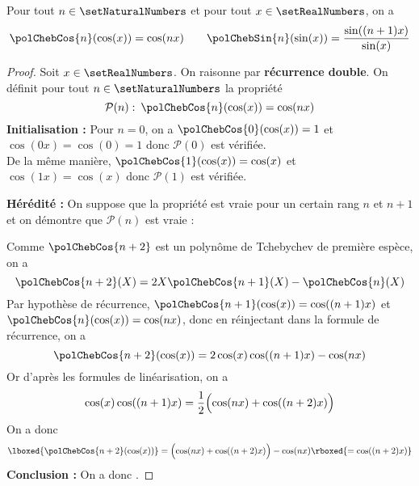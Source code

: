 \begin{property}
Pour tout $n \in \setNaturalNumbers$ et pour tout $x \in \setRealNumbers$, on a
\[
\polChebCos{n}(\cos(x))=\cos(nx) 
\quad\quad
\polChebSin{n}(\sin(x))=\dfrac{\sin((n+1)x)}{\sin(x)}
\]
\end{property}

\begin{proof}
Soit $x \in \setRealNumbers$. On raisonne par \textbf{récurrence double}. On définit pour tout $n \in \setNaturalNumbers$ la propriété
\[
\mathcal{P}(n) : \:\polChebCos{n}(\cos(x))=\cos(nx) 
\]
\textbf{Initialisation :} Pour $n=0$, on a $\polChebCos{0}(\cos(x)) = 1$ et $\cos(0x) =\cos(0) = 1$ donc $\mathcal{P}(0)$ est vérifiée.\\
De la même manière, $\polChebCos{1}(\cos(x)) = \cos(x)$ et $\cos(1x)=\cos(x)$ donc $\mathcal{P}(1)$ est vérifiée. 

\textbf{Hérédité :} On suppose que la propriété est vraie pour un certain rang $n$ et $n+1$ et on démontre que $\mathcal{P}(n)$ est vraie :

Comme $\polChebCos{n+2}$ est un polynôme de Tchebychev de première espèce, on a 
\[
\polChebCos{n+2}(X) = 2 X \polChebCos{n+1}(X) - \polChebCos{n}(X)
\]
Par hypothèse de récurrence, $\polChebCos{n+1}(\cos(x)) = \cos((n+1)x)$ et $\polChebCos{n}(\cos(x)) = \cos(nx)$, donc en réinjectant dans la formule de récurrence, on a 
\[
\polChebCos{n+2}(\cos(x)) = 2 \cos(x)\cos((n+1)x) - \cos(nx)
\]
Or d'après les formules de linéarisation, on a 
\[
\cos(x)\cos((n+1)x) = \dfrac{1}{2}\Bigl(\cos(nx)+\cos((n+2)x)\Bigr)
\]
On a donc 
\[
\lboxed{\polChebCos{n+2}(\cos(x))} = \Bigl(\cos(nx)+\cos((n+2)x)\Bigr) - \cos(nx) \rboxed{= \cos((n+2)x)}
\]
\textbf{Conclusion :} On a donc . 
\end{proof}


